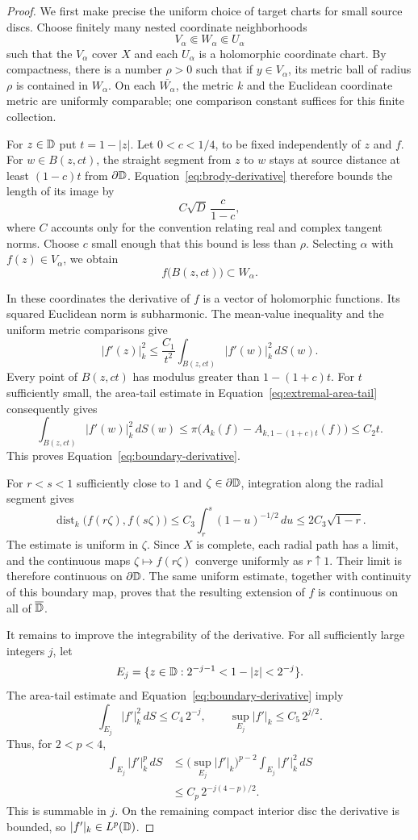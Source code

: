 \begin{proof}
We first make precise the uniform choice of target charts for small
source discs. Choose finitely many nested coordinate neighborhoods
\[
 V_\alpha\Subset W_\alpha\Subset U_\alpha
\]
such that the $V_\alpha$ cover $X$ and each $U_\alpha$ is a holomorphic
coordinate chart. By compactness, there is a number $\rho>0$ such that
if $y\in V_\alpha$, its metric ball of radius $\rho$ is contained in
$W_\alpha$. On each $\overline{W_\alpha}$, the metric $k$ and the
Euclidean coordinate metric are uniformly comparable; one comparison
constant suffices for this finite collection.

For $z\in\mathbb D$ put $t=1-|z|$. Let $0<c<1/4$, to be fixed independently
of $z$ and $f$. For $w\in B(z,ct)$, the straight segment from $z$ to
$w$ stays at source distance at least $(1-c)t$ from $\partial\mathbb D$.
Equation~\eqref{eq:brody-derivative} therefore bounds the length of
its image by
\[
 C\sqrt D\,\frac{c}{1-c},
\]
where $C$ accounts only for the convention relating real and complex
tangent norms. Choose $c$ small enough that this bound is less than
$\rho$. Selecting $\alpha$ with $f(z)\in V_\alpha$, we obtain
\[
 f\bigl(B(z,ct)\bigr)\subset W_\alpha.
\]

In these coordinates the derivative of $f$ is a vector of holomorphic
functions. Its squared Euclidean norm is subharmonic. The mean-value
inequality and the uniform metric comparisons give
\[
 |f'(z)|_k^2
 \leq\frac{C_1}{t^2}
       \int_{B(z,ct)}|f'(w)|_k^2\,dS(w).
\]
Every point of $B(z,ct)$ has modulus greater than
$1-(1+c)t$. For $t$ sufficiently small, the area-tail estimate in
Equation~\eqref{eq:extremal-area-tail} consequently gives
\[
 \int_{B(z,ct)}|f'(w)|_k^2\,dS(w)
 \leq\pi\bigl(A_k(f)-A_{k,1-(1+c)t}(f)\bigr)
 \leq C_2t.
\]
This proves Equation~\eqref{eq:boundary-derivative}.

For $r<s<1$ sufficiently close to $1$ and $\zeta\in\partial\mathbb D$,
integration along the radial segment gives
\[
 \operatorname{dist}_k\bigl(f(r\zeta),f(s\zeta)\bigr)
 \leq C_3\int_r^s(1-u)^{-1/2}\,du
 \leq2C_3\sqrt{1-r}.
\]
The estimate is uniform in $\zeta$. Since $X$ is complete, each radial
path has a limit, and the continuous maps
$\zeta\mapsto f(r\zeta)$ converge uniformly as $r\uparrow1$. Their
limit is therefore continuous on $\partial\mathbb D$. The same uniform
estimate, together with continuity of this boundary map, proves that
the resulting extension of $f$ is continuous on all of $\overline{\mathbb D}$.

It remains to improve the integrability of the derivative. For all
sufficiently large integers $j$, let
\[
 E_j=\{z\in\mathbb D:2^{-j-1}<1-|z|<2^{-j}\}.
\]
The area-tail estimate and Equation~\eqref{eq:boundary-derivative} imply
\[
 \int_{E_j}|f'|_k^2\,dS\leq C_4\,2^{-j},
 \qquad
 \sup_{E_j}|f'|_k\leq C_5\,2^{j/2}.
\]
Thus, for $2<p<4$,
\[
 \begin{split}
 \int_{E_j}|f'|_k^p\,dS
 &\leq\bigl(\sup_{E_j}|f'|_k\bigr)^{p-2}
              \int_{E_j}|f'|_k^2\,dS\\
 &\leq C_p\,2^{-j(4-p)/2}.
 \end{split}
\]
This is summable in $j$. On the remaining compact interior disc the
derivative is bounded, so $|f'|_k\in L^p(\mathbb D)$.


\end{proof}
